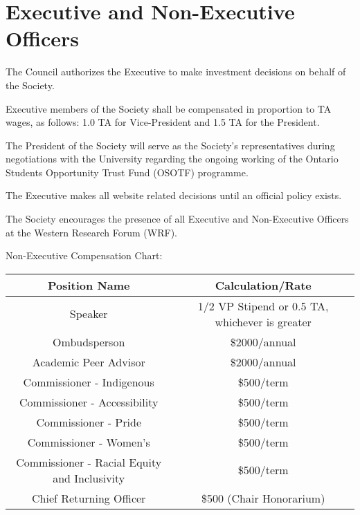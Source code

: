 \section{Executive and Non-Executive Officers}
\begin{longenum}[ label*=\thesection.\arabic*., align=left]
\item The Council authorizes the Executive to make investment decisions on behalf of the Society.
\item Executive members of the Society shall be compensated in proportion to TA wages, as follows: 1.0 TA for Vice-President and 1.5 TA for the President.
\item The President of the Society will serve as the Society’s representatives during negotiations with the University regarding the ongoing working of the Ontario Students Opportunity Trust Fund (OSOTF) programme.
\item The Executive makes all website related decisions until an official policy exists.
\item The Society encourages the presence of all Executive and Non-Executive Officers at the Western Research Forum (WRF).

\item{Non-Executive Compensation Chart:}
\begin{center}
    \begin{tabular}{  c | c }
\index{Non-Executive!Compensation Chart}
    Position Name & Calculation/Rate  \\ \hline 
    Speaker & 1/2 VP Stipend  or 0.5 TA,  whichever is greater \\ 
    Ombudsperson & \$2000/annual  \\ 
    Academic Peer Advisor & \$2000/annual \\ 
    Commissioner - Indigenous & \$500/term  \\ 
    Commissioner - Accessibility & \$500/term  \\ 
    Commissioner - Pride & \$500/term \\ 
    Commissioner - Women's & \$500/term \\ 
    Commissioner - Racial Equity and Inclusivity & \$500/term \\ 
    Chief Returning Officer & \$500 (Chair Honorarium) \\ 

\end{tabular}
\end{center}
\end{longenum}

